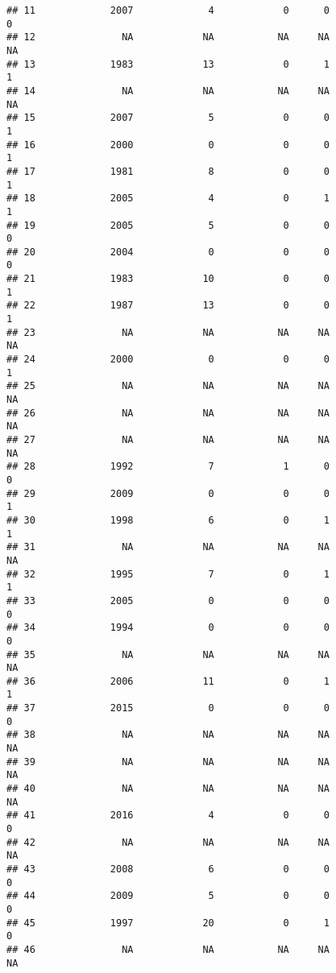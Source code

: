 \documentclass[
  english,
  man]{apa6}
\begin{document}
\begin{verbatim}
## 11             2007             4            0      0               0
## 12               NA            NA           NA     NA              NA
## 13             1983            13            0      1               1
## 14               NA            NA           NA     NA              NA
## 15             2007             5            0      0               1
## 16             2000             0            0      0               1
## 17             1981             8            0      0               1
## 18             2005             4            0      1               1
## 19             2005             5            0      0               0
## 20             2004             0            0      0               0
## 21             1983            10            0      0               1
## 22             1987            13            0      0               1
## 23               NA            NA           NA     NA              NA
## 24             2000             0            0      0               1
## 25               NA            NA           NA     NA              NA
## 26               NA            NA           NA     NA              NA
## 27               NA            NA           NA     NA              NA
## 28             1992             7            1      0               0
## 29             2009             0            0      0               1
## 30             1998             6            0      1               1
## 31               NA            NA           NA     NA              NA
## 32             1995             7            0      1               1
## 33             2005             0            0      0               0
## 34             1994             0            0      0               0
## 35               NA            NA           NA     NA              NA
## 36             2006            11            0      1               1
## 37             2015             0            0      0               0
## 38               NA            NA           NA     NA              NA
## 39               NA            NA           NA     NA              NA
## 40               NA            NA           NA     NA              NA
## 41             2016             4            0      0               0
## 42               NA            NA           NA     NA              NA
## 43             2008             6            0      0               0
## 44             2009             5            0      0               0
## 45             1997            20            0      1               0
## 46               NA            NA           NA     NA              NA

\end{verbatim}
\end{document}

